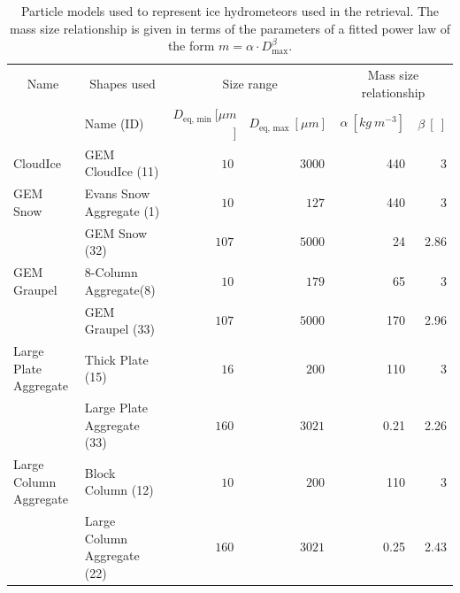 \documentclass[journal abbreviation, manuscript]{copernicus}
\begin{document}
\begin{table}
  \centering
  \caption{Particle models used to represent ice hydrometeors used in the
    retrieval. The mass size relationship is given in terms of the parameters
  of a fitted power law of the form $m = \alpha \cdot D_\text{max}^\beta$.}
  \begin{tabular}{l|l|rr|rr}
    \multicolumn{1}{c|}{Name} & \multicolumn{1}{c|}{Shapes used} &
    \multicolumn{2}{c|}{Size range} & \multicolumn{2}{c}{Mass size relationship}
    \\
    & Name (ID) &$D_{\text{eq}, \text{ min}}\ [\unit{\mu m}$] &
    $D_{\text{eq}, \text{ max}}\ [\unit{\mu m}]$ &\hfill
    $\alpha\ [\unit{kg\ m^{-3}}]$ & \hfill $\beta\ [\ ]$ \\
    \hline \hline %
    CloudIce & GEM CloudIce (11) & $10\ $ & $3000\ $ & \hfill 440 & \hfill 3 \\
    \hline GEM Snow & Evans Snow Aggregate (1) & $10\ $ & $127\ $ & \hfill 440 &
    \hfill 3 \\ & GEM Snow (32) & $107\ $ & $5000\ $ & \hfill 24 & \hfill 2.86
    \\
    \hline GEM Graupel & 8-Column Aggregate(8) & $10\ $ & $179\ $ & \hfill 65 &
    \hfill 3 \\ & GEM Graupel (33) & $107\ $ & $5000\ $ & \hfill 170 & \hfill
    2.96 \\
    \hline Large Plate Aggregate & Thick Plate (15) & $16\ $ & $200\ $ & \hfill
    110 & \hfill 3 \\ & Large Plate Aggregate (33) & $160\ $ & $3021\ $ & \hfill
    0.21 & \hfill 2.26 \\
    \hline Large Column Aggregate & Block Column (12) & $10\ $ & $200\ $ &
    \hfill 110 & \hfill 3 \\ & Large Column Aggregate (22) & $160\ $ & $3021\ $
    & \hfill 0.25 & \hfill 2.43 \\
  \end{tabular}
  \label{tab:particle_properties}
\end{table}
\end{document}
